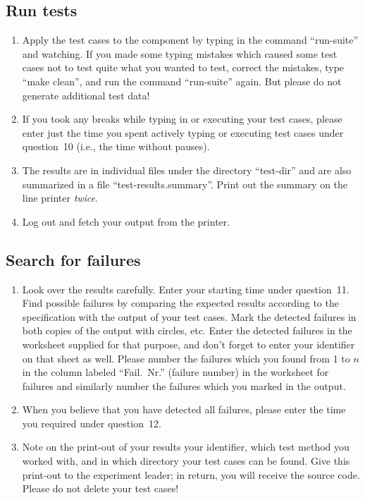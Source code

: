 \subsection*{Run tests}

\begin{enumerate}
\addtocounter{enumi}{6}

\item Apply the test cases to the component by typing in the command 
``run-suite'' and watching. 
If you made some typing mistakes which caused some test cases not to
test quite what you wanted to test, correct the mistakes, type ``make
clean'', and run the command ``run-suite'' again.
But please do not generate additional test data!

\item If you took any breaks while typing in or executing your test
cases, please enter just the time you spent actively typing or
executing test cases under question~10 (i.e., the time without
pauses).

\item The results are in individual files under the directory
``test-dir'' and are also summarized in a file ``test-results.summary''. 
Print out the summary on the line printer {\em twice}.

\item Log out and fetch your output from the printer.

\end{enumerate}

\subsection*{Search for failures}

\begin{enumerate}
\addtocounter{enumi}{10}

\item Look over the results carefully.  Enter your starting time under
question~11.
Find possible failures by comparing the expected results according to
the specification with the output of your test cases.
Mark the detected failures in both copies of the output with circles,
etc. 
Enter the detected failures in the worksheet supplied for that purpose,
and don't forget to enter your identifier on that sheet as well.
Please number the failures which you found from 1 to $n$ in the
column labeled ``Fail.~Nr.'' (failure number) in the worksheet for
failures and similarly number the failures which you marked in the 
output.

\item When you believe that you have detected all failures, please
enter the time you required under question~12.

\item Note on the print-out of your results your identifier, which
test method you worked with, and in which directory your test cases
can be found.  Give this print-out to the experiment leader; in
return, you will receive the source code.  Please do not delete your
test cases!

\end{enumerate}

